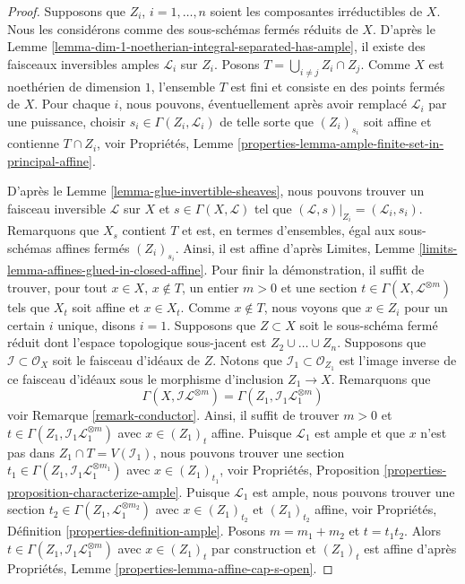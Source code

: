 \begin{proof}
Supposons que $Z_i$, $i = 1, \ldots, n$ soient les composantes
irréductibles de $X$. Nous les considérons comme des sous-schémas fermés
réduits de $X$. D'après le Lemme
\ref{lemma-dim-1-noetherian-integral-separated-has-ample}, il existe des faisceaux
inversibles amples $\mathcal{L}_i$ sur $Z_i$. Posons $T = \bigcup_{i \not = j} Z_i
\cap Z_j$. Comme $X$ est noethérien de dimension $1$, l'ensemble $T$ est fini et
consiste en des points fermés de $X$. Pour chaque $i$, nous pouvons, éventuellement
après avoir remplacé $\mathcal{L}_i$ par une puissance, choisir $s_i \in \Gamma(Z_i,
\mathcal{L}_i)$ de telle sorte que $(Z_i)_{s_i}$ soit affine et contienne $T \cap
Z_i$, voir Propriétés, Lemme \ref{properties-lemma-ample-finite-set-in-principal-affine}.

\medskip\noindent
D'après le Lemme \ref{lemma-glue-invertible-sheaves}, nous pouvons
trouver un faisceau inversible $\mathcal{L}$ sur $X$ et $s \in
\Gamma(X, \mathcal{L})$ tel que $(\mathcal{L}, s)|_{Z_i} =
(\mathcal{L}_i, s_i)$. Remarquons que $X_s$ contient $T$ et est, en
termes d'ensembles, égal aux sous-schémas affines fermés
$(Z_i)_{s_i}$. Ainsi, il est affine d'après Limites, Lemme
\ref{limits-lemma-affines-glued-in-closed-affine}. Pour finir la
démonstration, il suffit de trouver, pour tout $x \in X$, $x \not \in T$,
un entier $m > 0$ et une section $t \in \Gamma(X, \mathcal{L}^{\otimes
m})$ tels que $X_t$ soit affine et $x \in X_t$. Comme $x \not \in T$,
nous voyons que $x \in Z_i$ pour un certain $i$ unique, disons $i = 1$.
Supposons que $Z \subset X$ soit le sous-schéma fermé réduit dont l'espace
topologique sous-jacent est $Z_2 \cup \ldots \cup Z_n$. Supposons que
$\mathcal{I} \subset \mathcal{O}_X$ soit le faisceau d'idéaux de $Z$.
Notons que $\mathcal{I}_1 \subset \mathcal{O}_{Z_1}$ est l'image inverse de
ce faisceau d'idéaux sous le morphisme d'inclusion $Z_1 \to X$. Remarquons que
$$
\Gamma(X, \mathcal{I}\mathcal{L}^{\otimes m}) =
\Gamma(Z_1, \mathcal{I}_1 \mathcal{L}_1^{\otimes m})
$$
voir Remarque \ref{remark-conductor}. Ainsi, il suffit
de trouver $m > 0$ et $t \in \Gamma(Z_1, \mathcal{I}_1
\mathcal{L}_1^{\otimes m})$ avec $x \in (Z_1)_t$
affine. Puisque $\mathcal{L}_1$ est ample et que $x$
n'est pas dans $Z_1 \cap T = V(\mathcal{I}_1)$, nous
pouvons trouver une section $t_1 \in \Gamma(Z_1,
\mathcal{I}_1 \mathcal{L}_1^{\otimes m_1})$ avec $x \in
(Z_1)_{t_1}$, voir Propriétés, Proposition
\ref{properties-proposition-characterize-ample}. Puisque
$\mathcal{L}_1$ est ample, nous pouvons trouver une
section $t_2 \in \Gamma(Z_1, \mathcal{L}_1^{\otimes m_2})$
avec $x \in (Z_1)_{t_2}$ et $(Z_1)_{t_2}$ affine, voir
Propriétés, Définition \ref{properties-definition-ample}.
Posons $m = m_1 + m_2$ et $t = t_1 t_2$. Alors $t \in
\Gamma(Z_1, \mathcal{I}_1 \mathcal{L}_1^{\otimes m})$ avec $x
\in (Z_1)_t$ par construction et $(Z_1)_t$ est affine d'après
Propriétés, Lemme \ref{properties-lemma-affine-cap-s-open}.
\end{proof}

